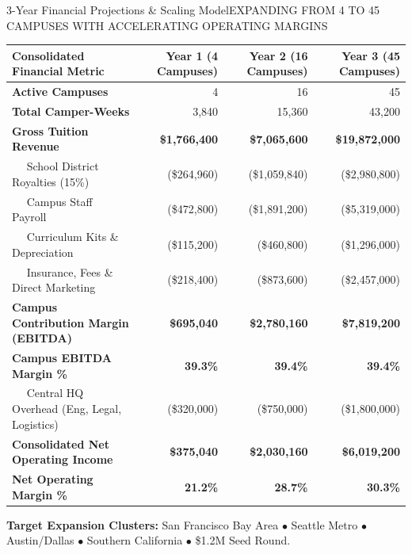 \documentclass[aspectratio=169,9pt]{beamer}
\begin{document}
\begin{frame}{3-Year Financial Projections \& Scaling Model}{EXPANDING FROM 4 TO 45 CAMPUSES WITH ACCELERATING OPERATING MARGINS}

\begin{table}[h]
\centering
\tiny
\begin{tabularx}{\textwidth}{Xrrr}
\toprule
\textbf{Consolidated Financial Metric} & \textbf{Year 1 (4 Campuses)} & \textbf{Year 2 (16 Campuses)} & \textbf{Year 3 (45 Campuses)} \\
\midrule
\textbf{Active Campuses} & 4 & 16 & 45 \\
\textbf{Total Camper-Weeks} & 3,840 & 15,360 & 43,200 \\
\midrule
\textbf{Gross Tuition Revenue} & \textbf{\$1,766,400} & \textbf{\$7,065,600} & \textbf{\$19,872,000} \\
\midrule
$\quad$ School District Royalties (15\%) & (\$264,960) & (\$1,059,840) & (\$2,980,800) \\
$\quad$ Campus Staff Payroll & (\$472,800) & (\$1,891,200) & (\$5,319,000) \\
$\quad$ Curriculum Kits \& Depreciation & (\$115,200) & (\$460,800) & (\$1,296,000) \\
$\quad$ Insurance, Fees \& Direct Marketing & (\$218,400) & (\$873,600) & (\$2,457,000) \\
\midrule
\textbf{Campus Contribution Margin (EBITDA)} & \textbf{\$695,040} & \textbf{\$2,780,160} & \textbf{\$7,819,200} \\
\textbf{Campus EBITDA Margin \%} & \textbf{39.3\%} & \textbf{39.4\%} & \textbf{39.4\%} \\
\midrule
$\quad$ Central HQ Overhead (Eng, Legal, Logistics) & (\$320,000) & (\$750,000) & (\$1,800,000) \\
\midrule
\textbf{Consolidated Net Operating Income} & \textbf{\$375,040} & \textbf{\$2,030,160} & \textbf{\$6,019,200} \\
\textbf{Net Operating Margin \%} & \textbf{21.2\%} & \textbf{28.7\%} & \textbf{30.3\%} \\
\bottomrule
\end{tabularx}
\end{table}

\vskip2pt
\begin{center}
  \textcolor{brandSlate}{\tiny \textbf{Target Expansion Clusters:} San Francisco Bay Area $\bullet$ Seattle Metro $\bullet$ Austin/Dallas $\bullet$ Southern California $\bullet$ \$1.2M Seed Round.}
\end{center}

\end{frame}
\end{document}
